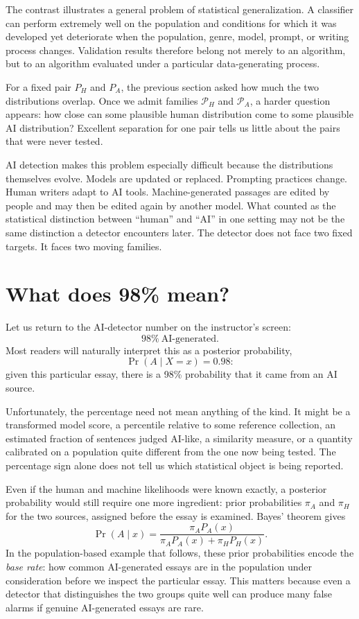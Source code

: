 \documentclass[pdflatex,sn-mathphys-num]{sn-jnl}
\begin{document}
The contrast illustrates a general problem of statistical generalization. A classifier can perform extremely well on the population and conditions 
for which it was developed yet deteriorate when the population, genre, model, prompt, or writing process changes. Validation results therefore 
belong not merely to an algorithm, but to an algorithm evaluated under a particular data-generating process.

For a fixed pair \(P_H\) and \(P_A\), the previous section asked how much the two distributions overlap. Once we admit families \(\mathcal P_H\) and 
\(\mathcal P_A\), a harder question appears: how close can some plausible human distribution come to some plausible AI distribution? Excellent 
separation for one pair tells us little about the pairs that were never tested.

AI detection makes this problem especially difficult because the distributions themselves evolve. Models are updated or replaced. Prompting 
practices change. Human writers adapt to AI tools. Machine-generated passages are edited by people and may then be edited again by another 
model. What counted as the statistical distinction between ``human'' and ``AI'' in one setting may not be the same distinction a detector encounters 
later. The detector does not face two fixed targets. It faces two moving families.

\section*{What does 98\% mean?}
Let us return to the AI-detector number on the instructor's screen:
\[
98\%\ \text{AI-generated}.
\]
Most readers will naturally interpret this as a posterior probability,
\[
\Pr(A\mid X=x)=0.98:
\]
given this particular essay, there is a 98\% probability that it came from an AI source.

Unfortunately, the percentage need not mean anything of the kind. It might be a transformed model score, a percentile relative to some reference 
collection, an estimated fraction of sentences judged AI-like, a similarity measure, or a quantity calibrated on a population quite different from 
the one now being tested. The percentage sign alone does not tell us which statistical object is being reported.

Even if the human and machine likelihoods were known exactly, a posterior probability would still require one more ingredient: prior probabilities \(\pi_A\) and \(\pi_H\) for the two sources, assigned before the essay is examined. Bayes' theorem gives
\begin{equation}
\Pr(A\mid x)
=\frac{\pi_A P_A(x)}{\pi_A P_A(x)+\pi_H P_H(x)}.
\label{eq:bayes}
\end{equation}
In the population-based example that follows, these prior probabilities encode the \emph{base rate}: how common AI-generated essays are in the population under consideration before we
inspect the particular essay. This matters because even a detector that distinguishes the two groups quite well can produce many false alarms if
genuine AI-generated essays are rare.
\end{document}
